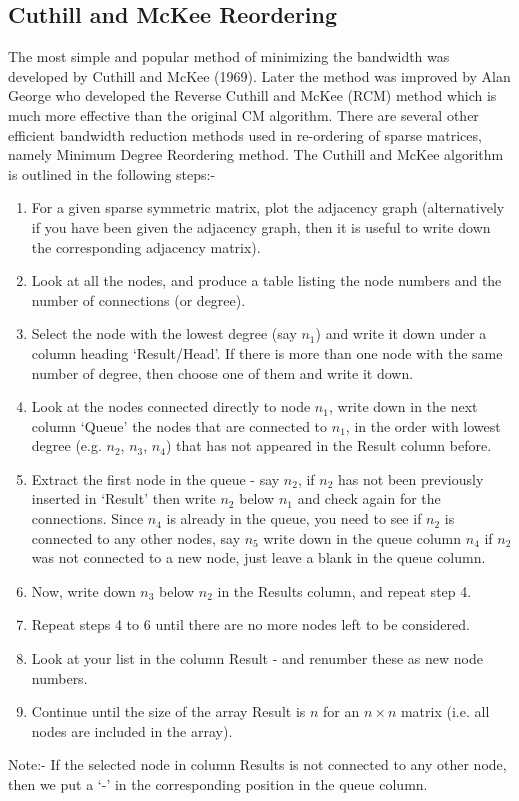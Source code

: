 \subsection{Cuthill and McKee Reordering}
The most simple and popular method of minimizing the bandwidth was developed by
Cuthill and McKee (1969).  Later the method was improved by Alan George who
developed the Reverse Cuthill and McKee (RCM) method which is much more
effective than the original CM algorithm.  There are several other efficient
bandwidth reduction methods used in re-ordering of sparse matrices, namely
Minimum Degree Reordering method.
\vskip 12pt
\noindent
The Cuthill and McKee algorithm is outlined in the following steps:-
\vskip 12pt
\noindent
\begin{enumerate}
   \item For a given sparse symmetric matrix, plot the adjacency graph
       (alternatively if you have been given the adjacency graph, then it is
       useful to write down the corresponding adjacency matrix).
\vskip 2pt
   \item Look at all the nodes, and produce a table listing the node numbers and
       the number of connections (or degree).
\vskip 2pt
   \item Select the node with the lowest degree (say $n_1$) and write it down
       under a column heading `Result/Head'.  If there is more than one node
       with the same number of degree, then choose one of them and write it down.
\vskip 2pt
   \item Look at the nodes connected directly to node $n_1$, write down in the
       next column `Queue' the nodes that are connected to $n_1$, in the order
       with lowest degree (e.g. $n_2$, $n_3$, $n_4$) that has not appeared in
       the Result column before.
\vskip 2pt
   \item Extract the first node in the queue - say $n_2$, if $n_2$ has not been
       previously inserted in `Result' then write $n_2$ below $n_1$ and check
       again for the connections.  Since $n_4$ is already in the queue, you need
       to see if $n_2$ is connected to any other nodes, say $n_5$ write down in
       the queue column $n_4$ if $n_2$ was not connected to a new node, just
       leave a blank in the queue column.
\vskip 2pt
   \item Now, write down $n_3$ below $n_2$ in the Results column, and repeat
       step 4.
\vskip 2pt
   \item Repeat steps 4 to 6 until there are no more nodes left to be
       considered.
\vskip 2pt
   \item Look at your list in the column Result - and renumber these as new node
       numbers.
\vskip 2pt
   \item Continue until the size of the array Result is $n$ for an $n\times n$
       matrix (i.e. all nodes are included in the array).
 \end{enumerate}
\vskip 6pt
\noindent
Note:- If the selected node in column Results is not connected to any other
node, then we put a `-' in the corresponding position in the queue column.

